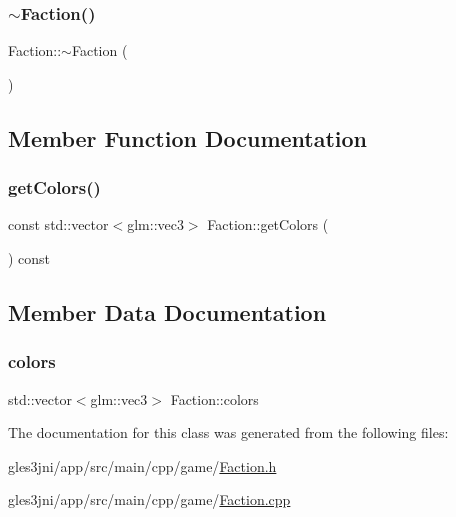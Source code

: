 \mbox{\label{class_faction_a83ef1c6c68945eb21dcc104196b06a84}} 
\subsubsection{\texorpdfstring{$\sim$\+Faction()}{~Faction()}}
{\footnotesize\ttfamily Faction\+::$\sim$\+Faction (\begin{DoxyParamCaption}{ }\end{DoxyParamCaption})}



\subsection{Member Function Documentation}
\mbox{\label{class_faction_a302367858679b7700c27bcdd2582e91b}} 
\subsubsection{\texorpdfstring{get\+Colors()}{getColors()}}
{\footnotesize\ttfamily const std\+::vector$<$glm\+::vec3$>$ Faction\+::get\+Colors (\begin{DoxyParamCaption}{ }\end{DoxyParamCaption}) const\hspace{0.3cm}{\ttfamily [inline]}}



\subsection{Member Data Documentation}
\mbox{\label{class_faction_a8f17ebea80da83ae86c9a1a518462ea5}} 
\subsubsection{\texorpdfstring{colors}{colors}}
{\footnotesize\ttfamily std\+::vector$<$glm\+::vec3$>$ Faction\+::colors\hspace{0.3cm}{\ttfamily [private]}}



The documentation for this class was generated from the following files\+:\begin{DoxyCompactItemize}
\item 
gles3jni/app/src/main/cpp/game/\hyperlink{_faction_8h}{Faction.\+h}\item 
gles3jni/app/src/main/cpp/game/\hyperlink{_faction_8cpp}{Faction.\+cpp}\end{DoxyCompactItemize}
